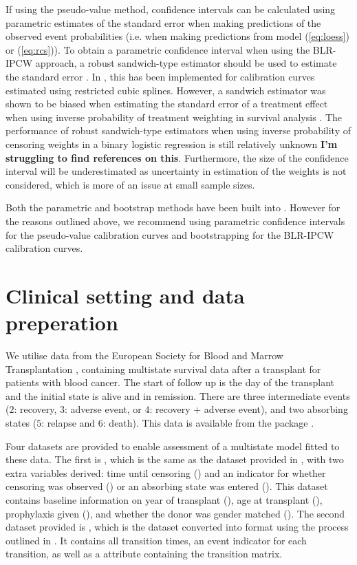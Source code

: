 \documentclass[article,shortnames]{jss}
\begin{document}
If using the pseudo-value method, confidence intervals can be calculated using parametric estimates of the standard error when making predictions of the observed event probabilities (i.e. when making predictions from model (\ref{eq:loess}) or (\ref{eq:rcs})). To obtain a parametric confidence interval when using the BLR-IPCW approach, a robust sandwich-type estimator should be used to estimate the standard error \citep{Hernan2020}. In , this has been implemented for calibration curves estimated using restricted cubic splines. However, a sandwich estimator was shown to be biased when estimating the standard error of a treatment effect when using inverse probability of treatment weighting in survival analysis \citep{Austin2016}. The performance of robust sandwich-type estimators when using inverse probability of censoring weights in a binary logistic regression is still relatively unknown \textbf{I'm struggling to find references on this}. Furthermore, the size of the confidence interval will be underestimated as uncertainty in estimation of the weights is not considered, which is more of an issue at small sample sizes.

Both the parametric and bootstrap methods have been built into . However for the reasons outlined above, we recommend using parametric confidence intervals for the pseudo-value calibration curves and bootstrapping for the BLR-IPCW calibration curves.

\section{Clinical setting and data preperation} \label{sec:dataprep}

We utilise data from the European Society for Blood and Marrow Transplantation \citep{EBMT2023}, containing multistate survival data after a transplant for patients with blood cancer. The start of follow up is the day of the transplant and the initial state is alive and in remission. There are three intermediate events ($2$: recovery, $3$: adverse event, or $4$: recovery + adverse event), and two absorbing states ($5$: relapse and $6$: death). This data is available from the  package \citep{DeWreede2011}.

Four datasets are provided to enable assessment of a multistate model fitted to these data. The first is , which is the same as the  dataset provided in  , with two extra variables derived: time until censoring () and an indicator for whether censoring was observed () or an absorbing state was entered (). This dataset contains baseline information on year of transplant (), age at transplant (), prophylaxis given (), and whether the donor was gender matched (). The second dataset provided is , which is the  dataset converted into  format using the process outlined in \cite{DeWreede2011}. It contains all transition times, an event indicator for each transition, as well as a  attribute containing the transition matrix.
\end{document}
